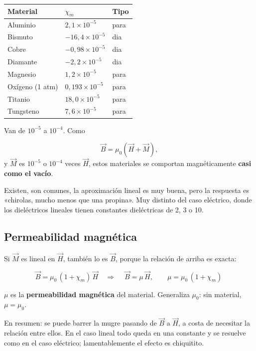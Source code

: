 \documentclass[12pt,a4paper]{article}
\begin{document}
\begin{center}
\renewcommand{\arraystretch}{1.35}
\small
\begin{tabularx}{\textwidth}{l>{\raggedright\arraybackslash}X>{\raggedright\arraybackslash}X}
\toprule
\textbf{Material} & \textbf{$\chi_m$} & \textbf{Tipo} \\
\midrule
Aluminio & $2{,}1\times10^{-5}$ & para \\
Bismuto & $-16{,}4\times10^{-5}$ & dia \\
Cobre & $-0{,}98\times10^{-5}$ & dia \\
Diamante & $-2{,}2\times10^{-5}$ & dia \\
Magnesio & $1{,}2\times10^{-5}$ & para \\
Oxígeno (1 atm) & $0{,}193\times10^{-5}$ & para \\
Titanio & $18{,}0\times10^{-5}$ & para \\
Tungsteno & $7{,}6\times10^{-5}$ & para \\
\bottomrule
\end{tabularx}
\end{center}

Van de $10^{-5}$ a $10^{-4}$. Como

\[
\vec B = \mu_0\left(\vec H + \vec M\right),
\]
y $\vec M$ es $10^{-5}$ o $10^{-4}$ veces $\vec H$, estos materiales se
comportan magnéticamente \textbf{casi como el vacío}.

\begin{notebox}
Existen, son comunes, la aproximación lineal
es muy buena, pero la respuesta es «chirolas, mucho menos que una propina».
Muy distinto del caso eléctrico, donde los dieléctricos lineales tienen
constantes dieléctricas de 2, 3 o 10.
\end{notebox}

\subsection{Permeabilidad magnética}

Si $\vec M$ es lineal en $\vec H$, también lo es $\vec B$, porque la relación
de arriba es exacta:

\[
\vec B = \mu_0\,(1+\chi_m)\,\vec H
\quad\Longrightarrow\quad
\boxed{\ \vec B = \mu\,\vec H,\qquad \mu = \mu_0\,(1+\chi_m)\ }
\]

$\mu$ es la \textbf{permeabilidad magnética} del material. Generaliza $\mu_0$: sin
material, $\mu = \mu_0$.

En resumen: se puede barrer la mugre pasando de $\vec B$ a $\vec H$, a costa
de necesitar la relación entre ellos. En el caso lineal todo queda en una
constante y se resuelve como en el caso eléctrico; lamentablemente el efecto
es chiquitito.
\end{document}
